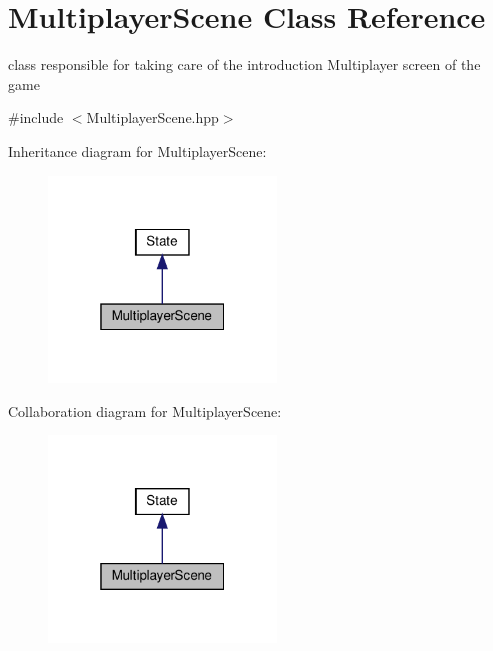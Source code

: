 \hypertarget{classMultiplayerScene}{}\section{Multiplayer\+Scene Class Reference}
\label{classMultiplayerScene}


class responsible for taking care of the introduction Multiplayer screen of the game  




{\ttfamily \#include $<$Multiplayer\+Scene.\+hpp$>$}



Inheritance diagram for Multiplayer\+Scene\+:
\nopagebreak
\begin{figure}[H]
\begin{center}
\leavevmode
\includegraphics[width=172pt]{classMultiplayerScene__inherit__graph}
\end{center}
\end{figure}


Collaboration diagram for Multiplayer\+Scene\+:
\nopagebreak
\begin{figure}[H]
\begin{center}
\leavevmode
\includegraphics[width=172pt]{classMultiplayerScene__coll__graph}
\end{center}
\end{figure}
